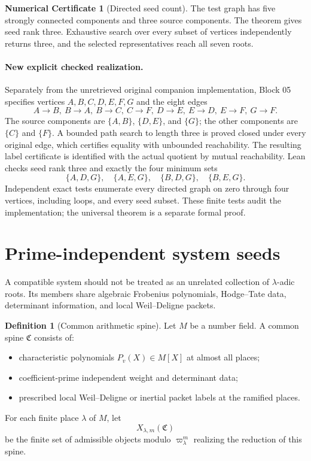 \documentclass[11pt]{article}
\theoremstyle{definition}
\newtheorem{definition}[theorem]{Definition}
\newtheorem{numericalcertificate}[theorem]{Numerical Certificate}
\theoremstyle{remark}
\newcommand{\Compat}{\mathfrak C}
\begin{document}
\begin{numericalcertificate}[Directed seed count]\label{px:7.4}
The test graph has five strongly connected components and three source components.  The theorem gives seed rank three.  Exhaustive search over every subset of vertices independently returns three, and the selected representatives reach all seven roots.

\paragraph{New explicit checked realization.}
Separately from the unretrieved original companion implementation, Block 05
specifies vertices $A,B,C,D,E,F,G$ and the eight edges
\[
 A\to B,\ B\to A,\ B\to C,\ C\to F,\ D\to E,\ E\to D,\ E\to F,\ G\to F.
\]
The source components are $\{A,B\}$, $\{D,E\}$, and $\{G\}$; the other
components are $\{C\}$ and $\{F\}$. A bounded path search to length three
is proved closed under every original edge, which certifies equality with
unbounded reachability. The resulting label certificate is identified with
the actual quotient by mutual reachability. Lean checks seed rank three and
exactly the four minimum sets
\[
 \{A,D,G\},\quad\{A,E,G\},\quad\{B,D,G\},\quad\{B,E,G\}.
\]
Independent exact tests enumerate every directed graph on zero through four
vertices, including loops, and every seed subset. These finite tests audit the
implementation; the universal theorem is a separate formal proof.

\end{numericalcertificate}

\section{Prime-independent system seeds}

A compatible system should not be treated as an unrelated collection of \(\lambda\)-adic roots.  Its members share algebraic Frobenius polynomials, Hodge--Tate data, determinant information, and local Weil--Deligne packets.

\begin{definition}[Common arithmetic spine]\label{px:8.1}
Let \(M\) be a number field.  A common spine \(\Compat\) consists of:
\begin{itemize}
\item characteristic polynomials \(P_v(X)\in M[X]\) at almost all places;
\item coefficient-prime independent weight and determinant data;
\item prescribed local Weil--Deligne or inertial packet labels at the ramified places.
\end{itemize}
For each finite place \(\lambda\) of \(M\), let
\[
X_{\lambda,m}(\Compat)
\]
be the finite set of admissible objects modulo \(\varpi_\lambda^m\) realizing the reduction of this spine.
\end{definition}
\end{document}
